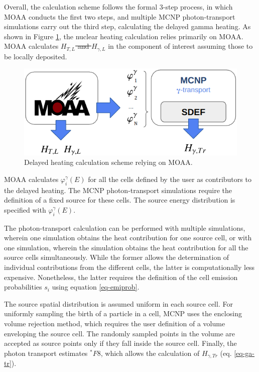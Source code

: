 \documentclass{style/nseJournal}
\providecommand{\DIFadd}[1]{{\protect\color{blue}\uwave{#1}}} %
\providecommand{\DIFdel}[1]{{\protect\color{red}\sout{#1}}}                      %
\providecommand{\DIFaddbegin}{} %
\providecommand{\DIFaddend}{} %
\providecommand{\DIFdelbegin}{} %
\providecommand{\DIFdelend}{} %
\begin{document}
Overall, the calculation scheme follows the formal 3-step process, in which MOAA conducts the first two steps, and multiple MCNP photon-transport simulations carry out the third step, calculating the delayed gamma heating.
As shown in Figure \ref{fig:workflow_2}, the nuclear heating calculation relies primarily on MOAA.
MOAA calculates \DIFdelbegin \DIFdel{$H_{T,L}$ and $H_{\gamma, L}$ }\DIFdelend \DIFaddbegin \DIFadd{$H_{\mathrm{T,L}}$ and $H_{\mathrm{\gamma, L}}$ }\DIFaddend in the component of interest assuming those to be locally deposited.

\begin{figure}[htbp!]
  \begin{center}
    \includegraphics[width=0.90\linewidth]{figures/heat_flow}
  \end{center}
  \caption{Delayed heating calculation scheme relying on MOAA.}
  \label{fig:workflow_2}
\end{figure}

MOAA calculates $\varphi^\gamma_i(E)$ for all the cells defined by the user as contributors to the delayed heating.
The MCNP photon-transport simulations require the definition of a fixed source for these cells.
The source energy distribution is specified with $\varphi^\gamma_i(E)$.

The photon-transport calculation can be performed with multiple simulations, wherein one simulation obtains the heat contribution for one source cell, or with one simulation, wherein the simulation obtains the heat contribution for all the source cells simultaneously.
While the former allows the determination of individual contributions from the different cells, the latter is computationally less expensive.
Nonetheless, the latter requires the definition of the cell emission probabilities $s_i$ using equation \ref{eq-emiprob}.

The source spatial distribution is assumed uniform in each source cell.
For uniformly sampling the birth of a particle in a cell, MCNP uses the enclosing volume rejection method, which requires the user definition of a volume enveloping the source cell.
The randomly sampled points in the volume are accepted as source points only if they fall inside the source cell.
Finally, the photon transport estimates $^\ast F8$, which allows the calculation of \DIFdelbegin \DIFdel{$H_{\gamma, Tr}$ }\DIFdelend \DIFaddbegin \DIFadd{$H_{\mathrm{\gamma, Tr}}$ }\DIFaddend (eq. \ref{eq-ga-tr}).
\end{document}
